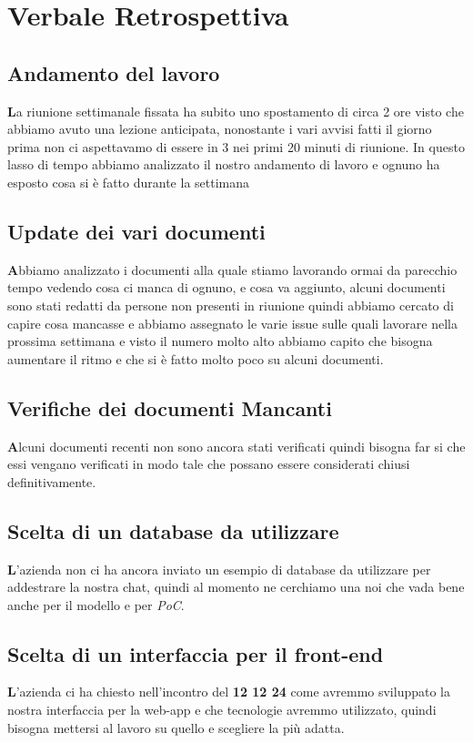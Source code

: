\documentclass{article}
\begin{document}
\newpage
\section{Verbale Retrospettiva}
\subsection{Andamento del lavoro}
\textbf La riunione settimanale fissata ha subito uno spostamento di circa 2 ore visto che abbiamo avuto una lezione anticipata, nonostante i vari avvisi
fatti il giorno prima non ci aspettavamo di essere in 3 nei primi 20 minuti di riunione. In questo lasso di tempo abbiamo analizzato il nostro andamento di lavoro e ognuno ha esposto cosa si è fatto
durante la settimana
\subsection{Update dei vari documenti}
\textbf Abbiamo analizzato i documenti alla quale stiamo lavorando ormai da parecchio tempo vedendo cosa ci manca di ognuno, e cosa va aggiunto, alcuni documenti sono stati redatti da persone non presenti in riunione
quindi abbiamo cercato di capire cosa mancasse e abbiamo assegnato le varie issue sulle quali lavorare nella prossima settimana e visto il numero molto alto abbiamo capito che bisogna aumentare il ritmo e che si è fatto molto poco su alcuni documenti.
\subsection{Verifiche dei documenti Mancanti}
\textbf Alcuni documenti recenti non sono ancora stati verificati quindi bisogna far si che essi vengano verificati in modo tale che possano essere considerati chiusi definitivamente.
\subsection{Scelta di un database da utilizzare}
\textbf L'azienda non ci ha ancora inviato un esempio di database da utilizzare per addestrare la nostra chat, quindi al momento ne cerchiamo una noi che vada bene anche per il modello e per \emph{PoC}.
\subsection{Scelta di un interfaccia per il front-end}
\textbf L'azienda ci ha chiesto nell'incontro del \textbf{12 12 24} come avremmo sviluppato la nostra interfaccia per la web-app e che tecnologie avremmo utilizzato, quindi bisogna mettersi al lavoro su quello e scegliere la più adatta.
\end{document}
